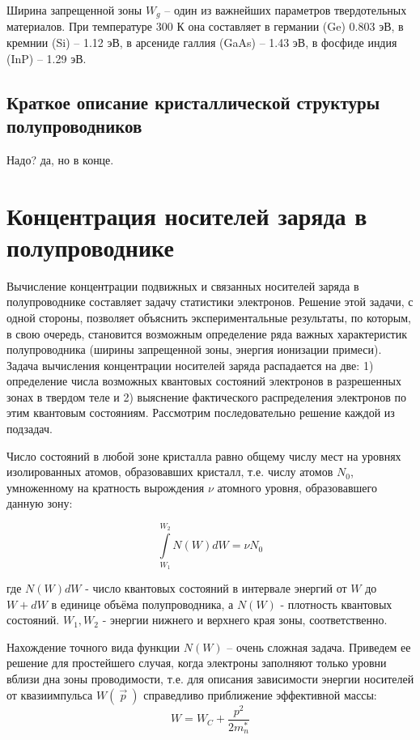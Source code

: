Ширина запрещенной зоны $W_g$  – один из важнейших параметров твердотельных материалов.
При температуре 300 К она составляет в германии (Ge) 0.803 эВ, в кремнии (Si) – 1.12 эВ, в арсениде галлия (GaAs) – 1.43
эВ, в фосфиде индия (InP) – 1.29 эВ.

\subsection{Краткое описание кристаллической структуры полупроводников}
Надо? да, но в конце.

\section{Концентрация носителей заряда в полупроводнике}
Вычисление концентрации подвижных и связанных носителей заряда в полупроводнике составляет задачу статистики электронов.
Решение этой задачи, с одной стороны, позволяет объяснить экспериментальные результаты, по которым, в свою очередь,
становится возможным определение ряда важных характеристик полупроводника (ширины запрещенной зоны, энергия ионизации примеси).
Задача вычисления концентрации носителей заряда распадается на две:  1) определение числа возможных квантовых состояний
электронов в разрешенных зонах в твердом теле и 2) выяснение фактического распределения электронов по этим квантовым
состояниям. Рассмотрим последовательно решение каждой из подзадач.

Число состояний в любой зоне кристалла равно общему числу мест на уровнях изолированных атомов, образовавших кристалл,
т.е. числу атомов $N_0$, умноженному на кратность вырождения $\nu$ атомного уровня, образовавшего данную зону:

\begin{equation}
	\int \limits_{W_1}^{W_2} N(W) dW  =\nu N_0 
	\label{eq:2.1}
\end{equation} 

где $N(W)dW$ - число  квантовых состояний в интервале энергий от $W$ до $W+dW$ в единице объёма полупроводника, а $N(W)$
-  плотность квантовых состояний. $W_1,W_2$ - энергии нижнего и верхнего края зоны, соответственно. 

Нахождение точного вида функции $N(W)$ – очень сложная задача. Приведем ее решение для простейшего случая, когда электроны
заполняют только уровни вблизи дна зоны проводимости, т.е. для описания зависимости энергии носителей от квазиимпульса
$W(~\vec{p}~)$ справедливо приближение эффективной массы:   
\begin{equation}
	W = W_C + \frac{p^2}{2m_n^*}
	\label{eq:2.2}
\end{equation}

